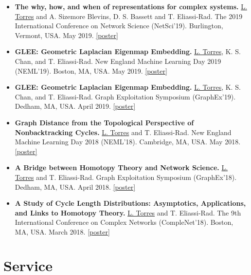 \documentclass[12pt,]{scrartcl}
\newenvironment{myitemize}
{ \begin{itemize}
    \setlength{\itemsep}{5pt}
    \setlength{\parskip}{0pt}
    \setlength{\parsep}{0pt}     }
{ \end{itemize}                  }
\begin{document}
\begin{myitemize}
\leftskip-0.25in %

\item \textbf{The why, how, and when of representations for complex systems.} \underline{L. Torres} and A. Sizemore Blevins, D. S. Bassett and T. Eliassi-Rad. The 2019 International Conference on Network Science (NetSci'19). Burlington, Vermont, USA. May 2019. \href{http://leotrs.com/static/hyper_poster.pdf}{[poster]}

\item \textbf{GLEE: Geometric Laplacian Eigenmap Embedding.} \underline{L. Torres}, K. S. Chan, and T. Eliassi-Rad. New England Machine Learning Day 2019 (NEML'19). Boston, MA, USA. May 2019. \href{http://leotrs.com/static/glee_poster.pdf}{[poster]}

\item \textbf{GLEE: Geometric Laplacian Eigenmap Embedding.} \underline{L. Torres}, K. S. Chan, and T. Eliassi-Rad. Graph Exploitation Symposium (GraphEx'19). Dedham, MA, USA. April 2019. \href{http://leotrs.com/static/glee_poster.pdf}{[poster]}

\item \textbf{Graph Distance from the Topological Perspective of Nonbacktracking Cycles.} \underline{L. Torres} and T. Eliassi-Rad. New England Machine Learning Day 2018 (NEML'18). Cambridge, MA, USA. May 2018. \href{http://leotrs.com/static/neml18.pdf}{[poster]}

\item \textbf{A Bridge between Homotopy Theory and Network Science.} \underline{L. Torres} and T. Eliassi-Rad. Graph Exploitation Symposium (GraphEx'18). Dedham, MA, USA. April 2018. \href{http://leotrs.com/static/graphex18.pdf}{[poster]}

\item \textbf{A Study of Cycle Length Distributions: Asymptotics, Applications, and Links to Homotopy Theory.} \underline{L. Torres} and T. Eliassi-Rad. The 9th International Conference on Complex Networks (CompleNet'18). Boston, MA, USA. March 2018. \href{http://leotrs.com/static/complenet18.pdf}{[poster]}

\end{myitemize}



\section{Service}\label{academic-activities}
\end{document}
